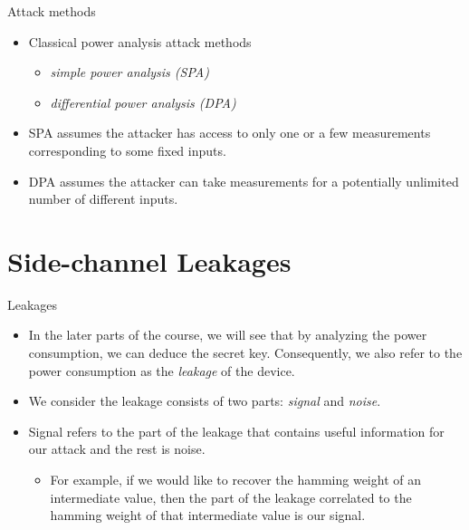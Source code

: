\begin{frame}{Attack methods}
    \begin{itemize}
        \item Classical power analysis attack methods
        \begin{itemize}
            \item \textit{simple power analysis (SPA)}
            \item \textit{differential power analysis (DPA)}
        \end{itemize}
        \item SPA assumes the attacker has access to only one or a few measurements corresponding to some fixed inputs.
        \item DPA assumes the attacker can take measurements for a potentially unlimited number of different inputs.
    \end{itemize}
\end{frame}

\section{Side-channel Leakages}
\begin{frame}{\VideoName}
    \tableofcontents[currentsection]
\end{frame}

\begin{frame}{Leakages}
    \begin{itemize}
        \item In the later parts of the course, we will see that by analyzing the power consumption, we can deduce the secret key. Consequently, we also refer to the power consumption as the \textit{leakage} of the device.
       \item We consider the leakage consists of two parts: \textit{signal} and \textit{noise}.
       \item Signal refers to the part of the leakage that contains useful information for our attack and the rest is noise.
       \begin{itemize}
           \item For example, if we would like to recover the hamming weight of an intermediate value, then the part of the leakage correlated to the hamming weight of that intermediate value is our signal.
       \end{itemize}
    \end{itemize}
\end{frame}

